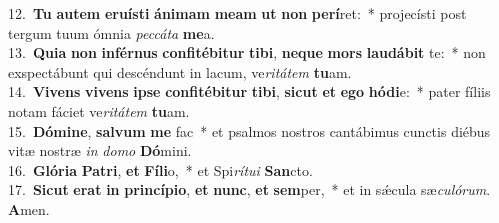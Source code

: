 {12.~}\textbf{Tu} \textbf{au}\textbf{tem} \textbf{e}\textbf{ru}\textbf{í}\textbf{sti} \textbf{á}\textbf{ni}\textbf{mam} \textbf{me}\textbf{am} \textbf{ut} \textbf{non} \textbf{pe}\textbf{rí}ret:~* projecísti post tergum tuum ómnia \textit{pec}\textit{cá}\textit{ta} \textbf{me}a.\\
{13.~}\textbf{Qui}\textbf{a} \textbf{non} \textbf{in}\textbf{fér}\textbf{nus} \textbf{con}\textbf{fi}\textbf{té}\textbf{bi}\textbf{tur} \textbf{ti}\textbf{bi}, \textbf{ne}\textbf{que} \textbf{mors} \textbf{lau}\textbf{dá}\textbf{bit} te:~* non exspectábunt qui descéndunt in lacum, ve\textit{ri}\textit{tá}\textit{tem} \textbf{tu}am.\\
{14.~}\textbf{Vi}\textbf{vens} \textbf{vi}\textbf{vens} \textbf{i}\textbf{pse} \textbf{con}\textbf{fi}\textbf{té}\textbf{bi}\textbf{tur} \textbf{ti}\textbf{bi}, \textbf{si}\textbf{cut} \textbf{et} \textbf{e}\textbf{go} \textbf{hó}\textbf{di}e:~* pater fíliis notam fáciet ve\textit{ri}\textit{tá}\textit{tem} \textbf{tu}am.\\
{15.~}\textbf{Dó}\textbf{mi}\textbf{ne}, \textbf{sal}\textbf{vum} \textbf{me} fac~* et psalmos nostros cantábimus cunctis diébus vitæ nostræ \textit{in} \textit{do}\textit{mo} \textbf{Dó}mini.\\
{16.~}\textbf{Gló}\textbf{ri}\textbf{a} \textbf{Pa}\textbf{tri}, \textbf{et} \textbf{Fí}\textbf{li}o,~* et Spi\textit{rí}\textit{tu}\textit{i} \textbf{San}cto.\\
{17.~}\textbf{Si}\textbf{cut} \textbf{e}\textbf{rat} \textbf{in} \textbf{prin}\textbf{cí}\textbf{pi}\textbf{o}, \textbf{et} \textbf{nunc}, \textbf{et} \textbf{sem}per,~* et in sǽcula sæ\textit{cu}\textit{ló}\textit{rum}. \textbf{A}men.\\
